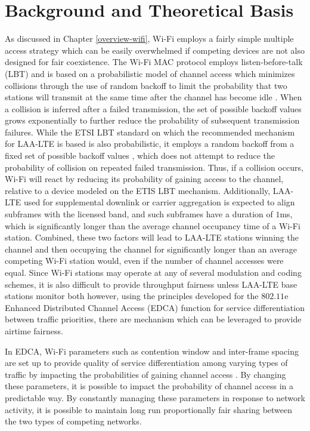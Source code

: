 \section{Background and Theoretical Basis}
\label{background}
As discussed in Chapter \ref{overview-wifi}, \mbox{Wi-Fi} employs a fairly simple multiple access strategy which can be easily overwhelmed if competing devices are not also designed for fair coexistence. The \mbox{Wi-Fi} MAC protocol employs listen-before-talk (LBT) and is based on a probabilistic model of channel access which minimizes collisions through the use of random backoff to limit the probability that two stations will transmit at the same time after the channel has become idle \cite{80211}.  When a collision is inferred after a failed transmission, the set of possible backoff values grows exponentially to further reduce the probability of subsequent transmission failures.  While the ETSI LBT standard on which the recommended mechanism for \mbox{LAA-LTE} is based is also probabilistic, it employs a random backoff from a fixed set of possible backoff values \cite{3gpp}, which does not attempt to reduce the probability of collision on repeated failed transmission.  Thus, if a collision occurs, \mbox{Wi-Fi} will react by reducing its probability of gaining access to the channel, relative to a device modeled on the ETIS LBT mechanism.  Additionally, \mbox{LAA-LTE} used for supplemental downlink or carrier aggregation is expected to align subframes with the licensed band, and such subframes have a duration of $1$ms, which is significantly longer than the average channel occupancy time of a Wi-Fi station.  Combined, these two factors will lead to \mbox{LAA-LTE} stations winning the channel and then occupying the channel for significantly longer than an average competing \mbox{Wi-Fi} station would, even if the number of channel accesses were equal.  Since \mbox{Wi-Fi} stations may operate at any of several modulation and coding schemes, it is also difficult to provide throughput fairness unless \mbox{LAA-LTE} base stations monitor both however, using the principles developed for the $802.11$e Enhanced Distributed Channel Access (EDCA) function for service differentiation between traffic priorities, there are mechanism which can be leveraged to provide airtime fairness.  

In EDCA, \mbox{Wi-Fi} parameters such as contention window and inter-frame spacing are set up to provide quality of service differentiation among varying types of traffic by impacting the probabilities of gaining channel access \cite{80211}.  By changing these parameters, it is possible to impact the probability of channel access in a predictable way.  By constantly managing these parameters in response to network activity, it is possible to maintain long run proportionally fair sharing between the two types of competing networks.  

